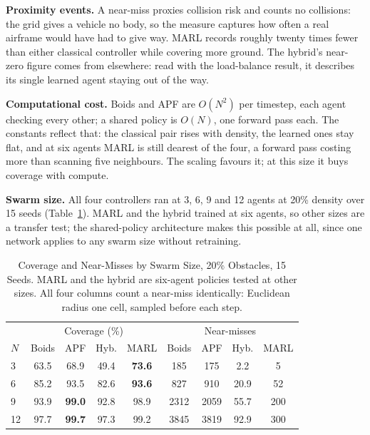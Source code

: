\documentclass[a4paper, 10pt, conference]{ieeeconf}
\begin{document}
\textbf{Proximity events.} A near-miss proxies collision risk and
counts no collisions: the grid gives a vehicle no body, so the measure
captures how often a real airframe would have had to give way. MARL
records roughly twenty times fewer than either classical controller
while covering more ground. The hybrid's near-zero figure comes from
elsewhere: read with the load-balance result, it describes its single
learned agent staying out of the way.

\textbf{Computational cost.} Boids and APF are $O(N^2)$ per timestep,
each agent checking every other; a shared policy is $O(N)$, one
forward pass each. The constants reflect that: the classical pair
rises with density, the learned ones stay flat, and at six agents MARL
is still dearest of the four, a forward pass costing more than
scanning five neighbours. The scaling favours it; at this size it buys
coverage with compute.

\textbf{Swarm size.} All four controllers ran at 3, 6, 9 and 12 agents
at 20\% density over 15 seeds (Table~\ref{tab:swarm}). MARL and the
hybrid trained at six agents, so other sizes are a transfer test; the
shared-policy architecture makes this possible at all, since one
network applies to any swarm size without retraining.

\begin{table}[htb]
\centering
\caption{Coverage and Near-Misses by Swarm Size, 20\% Obstacles,
15 Seeds. MARL and the hybrid are six-agent policies tested at other
sizes. All four columns count a near-miss identically: Euclidean
radius one cell, sampled before each step.}
\label{tab:swarm}
\scriptsize
\setlength{\tabcolsep}{3pt}
\begin{tabular}{lcccc|cccc}
\toprule
& \multicolumn{4}{c|}{Coverage (\%)} & \multicolumn{4}{c}{Near-misses} \\
$N$ & Boids & APF & Hyb. & MARL & Boids & APF & Hyb. & MARL \\
\midrule
3  & 63.5 & 68.9 & 49.4 & \textbf{73.6} & 185  & 175  & 2.2  & 5    \\
6  & 85.2 & 93.5 & 82.6 & \textbf{93.6} & 827  & 910  & 20.9 & 52   \\
9  & 93.9 & \textbf{99.0} & 92.8 & 98.9 & 2312 & 2059 & 55.7 & 200  \\
12 & 97.7 & \textbf{99.7} & 97.3 & 99.2 & 3845 & 3819 & 92.9 & 300  \\
\bottomrule
\end{tabular}
\end{table}
\end{document}
